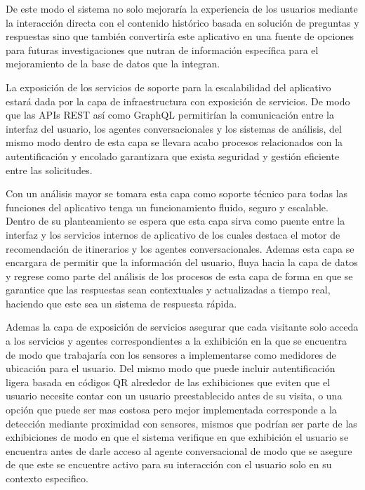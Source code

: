 \documentclass[pdflatex,sn-mathphys-num]{sn-jnl}%
\theoremstyle{thmstyleone}%
\theoremstyle{thmstyletwo}%
\theoremstyle{thmstylethree}%
\begin{document}
De este modo el sistema no solo mejoraría la experiencia de los usuarios mediante la interacción directa con el contenido histórico basada en solución de preguntas y respuestas sino que también convertiría este aplicativo en una fuente de opciones para futuras investigaciones que nutran de información específica para el mejoramiento de la base de datos que la integran.

La exposición de los servicios de soporte para la escalabilidad del aplicativo estará dada por la capa de infraestructura con exposición de servicios. De modo que las APIs REST así como GraphQL permitirían la comunicación entre la interfaz del usuario, los agentes conversacionales y los sistemas de análisis, del mismo modo dentro de esta capa se llevara acabo procesos relacionados con la autentificación y encolado garantizara que exista seguridad y gestión eficiente entre las solicitudes.

Con un análisis mayor se tomara esta capa como soporte técnico para todas las funciones del aplicativo tenga un funcionamiento fluido, seguro y escalable. Dentro de su planteamiento se espera que esta capa sirva como puente entre la interfaz y los servicios internos de aplicativo de los cuales destaca el motor de recomendación de itinerarios y los agentes conversacionales. Ademas esta capa se encargara de permitir que la información del usuario, fluya hacia la capa de datos y regrese como parte del análisis de los procesos de esta capa de forma en que se garantice que las respuestas sean contextuales y actualizadas a tiempo real, haciendo que este sea un sistema de respuesta rápida.

Ademas la capa de exposición de servicios asegurar que cada visitante solo acceda a los servicios y agentes correspondientes a la exhibición en la que se encuentra de modo que trabajaría con los sensores a implementarse como medidores de ubicación para el usuario. Del mismo modo que puede incluir autentificación ligera basada en códigos QR alrededor de las exhibiciones que eviten que el usuario necesite contar con un usuario preestablecido antes de su visita, o una opción que puede ser mas costosa pero mejor implementada corresponde a la detección mediante proximidad con sensores, mismos que podrían ser parte de las exhibiciones de modo en que el sistema verifique en que exhibición el usuario se encuentra  antes de darle acceso al agente conversacional de modo que se asegure de que este se encuentre 
activo para su interacción con el usuario solo en su contexto especifico.
\end{document}
